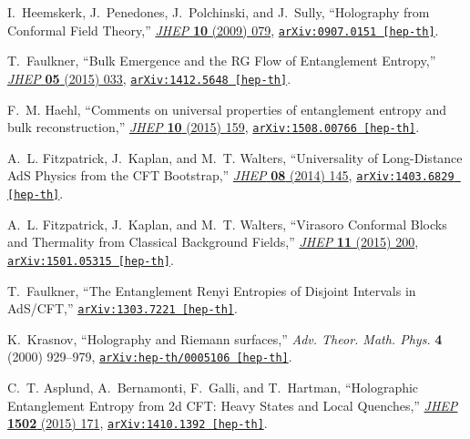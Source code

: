 \begin{thebibliography}{100}
I.~Heemskerk, J.~Penedones, J.~Polchinski, and J.~Sully, ``{Holography from
  Conformal Field Theory},''
  \href{http://dx.doi.org/10.1088/1126-6708/2009/10/079}{{\em JHEP} {\bf 10}
  (2009)  079},
\href{http://arxiv.org/abs/0907.0151}{{\tt arXiv:0907.0151 [hep-th]}}.

T.~Faulkner, ``{Bulk Emergence and the RG Flow of Entanglement Entropy},''
  \href{http://dx.doi.org/10.1007/JHEP05(2015)033}{{\em JHEP} {\bf 05} (2015)
  033},
\href{http://arxiv.org/abs/1412.5648}{{\tt arXiv:1412.5648 [hep-th]}}.

F.~M. Haehl, ``{Comments on universal properties of entanglement entropy and
  bulk reconstruction},'' \href{http://dx.doi.org/10.1007/JHEP10(2015)159}{{\em
  JHEP} {\bf 10} (2015)  159},
\href{http://arxiv.org/abs/1508.00766}{{\tt arXiv:1508.00766 [hep-th]}}.

A.~L. Fitzpatrick, J.~Kaplan, and M.~T. Walters, ``{Universality of
  Long-Distance AdS Physics from the CFT Bootstrap},''
  \href{http://dx.doi.org/10.1007/JHEP08(2014)145}{{\em JHEP} {\bf 08} (2014)
  145},
\href{http://arxiv.org/abs/1403.6829}{{\tt arXiv:1403.6829 [hep-th]}}.

A.~L. Fitzpatrick, J.~Kaplan, and M.~T. Walters, ``{Virasoro Conformal Blocks
  and Thermality from Classical Background Fields},''
  \href{http://dx.doi.org/10.1007/JHEP11(2015)200}{{\em JHEP} {\bf 11} (2015)
  200},
\href{http://arxiv.org/abs/1501.05315}{{\tt arXiv:1501.05315 [hep-th]}}.

T.~Faulkner, ``{The Entanglement Renyi Entropies of Disjoint Intervals in
  AdS/CFT},''
\href{http://arxiv.org/abs/1303.7221}{{\tt arXiv:1303.7221 [hep-th]}}.

K.~Krasnov, ``{Holography and Riemann surfaces},'' {\em Adv. Theor. Math.
  Phys.} {\bf 4} (2000)  929--979,
\href{http://arxiv.org/abs/hep-th/0005106}{{\tt arXiv:hep-th/0005106
  [hep-th]}}.

C.~T. Asplund, A.~Bernamonti, F.~Galli, and T.~Hartman, ``{Holographic
  Entanglement Entropy from 2d CFT: Heavy States and Local Quenches},''
  \href{http://dx.doi.org/10.1007/JHEP02(2015)171}{{\em JHEP} {\bf 1502} (2015)
   171},
\href{http://arxiv.org/abs/1410.1392}{{\tt arXiv:1410.1392 [hep-th]}}.


\end{thebibliography}
